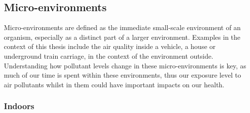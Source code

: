 
\subsection{Micro-environments}
\label{subsec:microenvironments}
Micro-environments are defined as the immediate small-scale environment of an organism, especially as a distinct part of a larger environment. Examples in the context of this thesis include the air quality inside a vehicle, a house or  underground train carriage, in the context of the environment outside. Understanding how pollutant levels change in these micro-environments is key, as much of our time is spent within these environments, thus our exposure level to air pollutants whilst in them could have important impacts on our health.

\subsubsection{Indoors}
\label{subsubsec:indoors}

